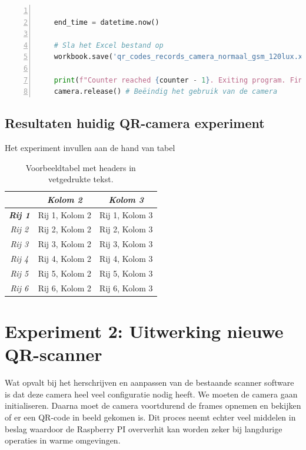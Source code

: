 \begin{lstlisting}[language=Python, caption={Python script voor experiment van QR-code camera.}, label=lst:huidigeQR-codeData, numbers=left]
    
    end_time = datetime.now()
    
    # Sla het Excel bestand op
    workbook.save('qr_codes_records_camera_normaal_gsm_120lux.xlsx')
    
    print(f"Counter reached {counter - 1}. Exiting program. Final time of scanning: {end_time - start_time}")
    camera.release() # Beëindig het gebruik van de camera    
\end{lstlisting}

\subsection{Resultaten huidig QR-camera experiment}
\label{sec:huidigeToepassingScannersExperiment}

Het experiment invullen aan de hand van tabel

\begin{table}[h]
    \centering
    \begin{tabular}{ c|c c }
        \hline
        & \textbf{\textit{Kolom 2}} & \textbf{\textit{Kolom 3}} \\
        \hline
        \textbf{\textit{Rij 1}} & Rij 1, Kolom 2 & Rij 1, Kolom 3 \\
        \textit{Rij 2} & Rij 2, Kolom 2 & Rij 2, Kolom 3 \\
        \textit{Rij 3} & Rij 3, Kolom 2 & Rij 3, Kolom 3 \\
        \textit{Rij 4} & Rij 4, Kolom 2 & Rij 4, Kolom 3 \\
        \textit{Rij 5} & Rij 5, Kolom 2 & Rij 5, Kolom 3 \\
        \textit{Rij 6} & Rij 6, Kolom 2 & Rij 6, Kolom 3 \\
        \hline
    \end{tabular}
    \caption{Voorbeeldtabel met headers in vetgedrukte tekst.}
    \label{tab:voorbeeldtabel}
\end{table}



\section{Experiment 2: Uitwerking nieuwe QR-scanner}
\label{sec:nieuweToepassing}

Wat opvalt bij het herschrijven en aanpassen van de bestaande scanner software is dat deze camera heel veel configuratie nodig heeft. We moeten de camera gaan initialiseren. Daarna moet de camera voortdurend de frames opnemen en bekijken of er een QR-code in beeld gekomen is. Dit proces neemt echter veel middelen in beslag waardoor de Raspberry PI oververhit kan worden zeker bij langdurige operaties in warme omgevingen.

